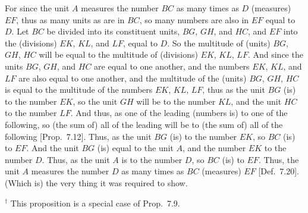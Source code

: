 \begin{Parallel}{}{}
{For since the unit $A$ measures the number $BC$ as many times as 
$D$ (measures) $EF$, thus as many units as are in $BC$, so many 
numbers are also in  $EF$ equal to $D$. Let $BC$ be divided into its
constituent units, $BG$, $GH$, and $HC$, and $EF$ into the (divisions) $EK$, $KL$, and $LF$, equal
to $D$. So the multitude of (units) $BG$, $GH$, $HC$ will be equal to the multitude
of (divisions) $EK$, $KL$, $LF$. And since the units $BG$, $GH$, and $HC$ are equal to
one another, and the numbers $EK$, $KL$,  and $LF$ are also equal to one another, and the multitude of the (units) $BG$, $GH$, $HC$ is
equal to the multitude of the numbers $EK$, $KL$, $LF$,
thus as the unit $BG$ (is) to the number $EK$, so the unit $GH$ will be to the number $KL$, and
the unit $HC$ to the number $LF$. And thus, as one of the leading (numbers is) to
one of the following, so (the sum of) all of the leading will be to (the sum of) all of the following 
[Prop.~7.12]. Thus, as the unit $BG$ (is) to the number $EK$,
so $BC$ (is) to $EF$. And the unit $BG$ (is) equal to the unit $A$, and the number
$EK$ to the number $D$. Thus, as the unit $A$ is to the number $D$, so $BC$ (is) to
$EF$. Thus, the unit $A$ measures the number $D$ as many times as $BC$ (measures)
$EF$ [Def.~7.20]. (Which is) the very thing it was required to show.}
\end{Parallel}
{\footnotesize\noindent$^\dag$ This proposition is a
special case of Prop.~7.9.}

